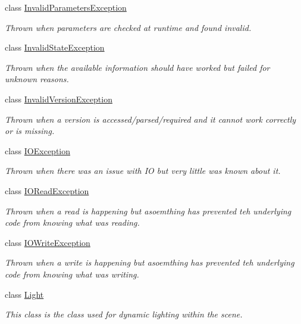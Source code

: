 \begin{DoxyCompactItemize}
class \hyperlink{classMezzanine_1_1InvalidParametersException}{Invalid\-Parameters\-Exception}
\begin{DoxyCompactList}\small\item\em Thrown when parameters are checked at runtime and found invalid. \end{DoxyCompactList}\item 
class \hyperlink{classMezzanine_1_1InvalidStateException}{Invalid\-State\-Exception}
\begin{DoxyCompactList}\small\item\em Thrown when the available information should have worked but failed for unknown reasons. \end{DoxyCompactList}\item 
class \hyperlink{classMezzanine_1_1InvalidVersionException}{Invalid\-Version\-Exception}
\begin{DoxyCompactList}\small\item\em Thrown when a version is accessed/parsed/required and it cannot work correctly or is missing. \end{DoxyCompactList}\item 
class \hyperlink{classMezzanine_1_1IOException}{I\-O\-Exception}
\begin{DoxyCompactList}\small\item\em Thrown when there was an issue with I\-O but very little was known about it. \end{DoxyCompactList}\item 
class \hyperlink{classMezzanine_1_1IOReadException}{I\-O\-Read\-Exception}
\begin{DoxyCompactList}\small\item\em Thrown when a read is happening but asoemthing has prevented teh underlying code from knowing what was reading. \end{DoxyCompactList}\item 
class \hyperlink{classMezzanine_1_1IOWriteException}{I\-O\-Write\-Exception}
\begin{DoxyCompactList}\small\item\em Thrown when a write is happening but asoemthing has prevented teh underlying code from knowing what was writing. \end{DoxyCompactList}\item 
class \hyperlink{classMezzanine_1_1Light}{Light}
\begin{DoxyCompactList}\small\item\em This class is the class used for dynamic lighting within the scene. \end{DoxyCompactList}\item 

\end{DoxyCompactItemize}
